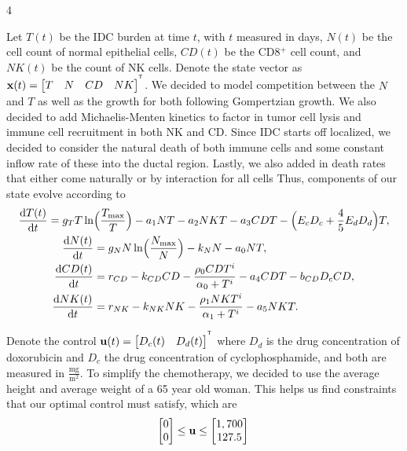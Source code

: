\documentclass[a0]{4by3}
\newcommand{\NumColumns}{4}
\begin{document}
\begin{minipage}{\linewidth + 2\fboxsep}
\begin{multicols*}{\NumColumns}
           
Let $T(t)$ be the IDC burden at time $t$,  with $t$ measured in days, $N(t)$ be the cell count of normal epithelial cells, $CD(t)$ be the CD8$^+$ cell count, and $NK(t)$ be the count of NK cells.
Denote the state vector as $\mathbf{x}(t) = \begin{bmatrix}T & N & CD & NK\end{bmatrix}^{^{\mathsf T}}$.
We decided to model competition between the $N$ and $T$ as well as the growth for both following Gompertzian growth.
We also decided to add Michaelis-Menten kinetics to factor in tumor cell lysis and immune cell recruitment in both NK and CD.
Since IDC starts off localized, we decided to consider the natural death of both immune cells and some constant inflow rate of these into the ductal region.
Lastly, we also added in death rates that either come naturally or by interaction for all cells
Thus, components of our state evolve according to
            \begin{align*}
           	 \frac{\diff T(t)}{\diff t} = g_T T \ln &\Bigl( \frac{T_{\max}}{T} \Bigr)- a_1NT - a_2NKT - a_3CDT -\Bigl( E_c D_c  +\frac{4}{5}E_d D_d\Bigr) T, \\
            	\frac{\diff N(t)}{\diff t} &= g_N N \ln\Bigl(\frac{N_{\max}}{N} \Bigr) - k_N N - a_0NT, \\
		\frac{\diff CD(t)}{\diff t} &= r_{CD} - k_{CD} CD - \frac{\rho_0 CDT ^ i}{\alpha_0 + T^i} - a_4CDT - b_{CD}D_cCD, \\
	         \frac{\diff NK(t)}{\diff t} &=r_{NK} - k_{NK} NK - \frac{\rho _1NKT^i}{\alpha_1 + T^i} - a_5 NK T.
            \end{align*}

Denote the control $\mathbf{u}(t)=\begin{bmatrix} D_c(t) & D_d(t) \end{bmatrix}^{^{\mathsf T}}$ where $D_d$ is the drug concentration of doxorubicin and $D_c$ the drug concentration of cyclophosphamide, and both are measured in  $\frac{\text{mg}}{\text{m}^2} $.
To simplify the chemotherapy, we decided to use the average height and average weight of a  65 year old woman.
This helps us find constraints that our optimal control must satisfy, which are
\[
\begin{bmatrix} 0\\  0  \end{bmatrix} \leq \mathbf{u} \leq \begin{bmatrix} 1,700\\  127.5  \end{bmatrix} \\
\]


\end{multicols*}
\end{minipage}
\end{document}
